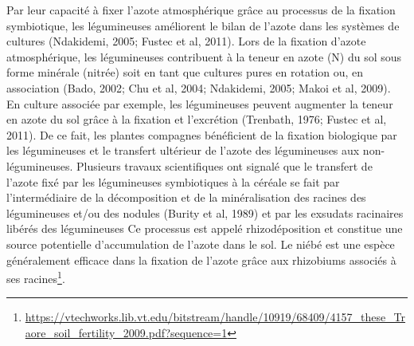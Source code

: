 \documentclass[a4paper,11pt]{article}
\begin{document}
Par leur capacité à fixer l’azote atmosphérique grâce au processus de
la fixation symbiotique, les légumineuses améliorent le bilan de
l'azote dans les systèmes de cultures (Ndakidemi, 2005; Fustec et al,
2011). Lors de la fixation d’azote atmosphérique, les légumineuses
contribuent à la teneur en azote (N) du sol sous forme minérale
(nitrée) soit en tant que cultures pures en rotation ou, en
association (Bado, 2002; Chu et al, 2004; Ndakidemi, 2005; Makoi et
al, 2009). En culture associée par exemple, les légumineuses peuvent
augmenter la teneur en azote du sol grâce à la fixation et l’excrétion
(Trenbath, 1976; Fustec et al, 2011). De ce fait, les plantes
compagnes bénéficient de la fixation biologique par les légumineuses
et le transfert ultérieur de l’azote des légumineuses aux
non-légumineuses. Plusieurs travaux scientifiques ont signalé que le
transfert de l’azote fixé par les légumineuses symbiotiques à la
céréale se fait par l’intermédiaire de la décomposition et de la
minéralisation des racines des légumineuses et/ou des nodules (Burity
et al, 1989) et par les exsudats racinaires libérés des légumineuses
\cite{Ndakidemi}
Ce processus est appelé rhizodéposition\cite{Fustec11} et constitue
une source potentielle d’accumulation de l’azote dans le
sol\cite{Koulibi_FideleZONGO}.  Le niébé est une espèce généralement
efficace dans la fixation de l’azote grâce aux rhizobiums associés à
ses racines\footnote{\url{https://vtechworks.lib.vt.edu/bitstream/handle/10919/68409/4157_these_Traore_soil_fertility_2009.pdf?sequence=1}}.

\newpage

 
  
\end{document}
